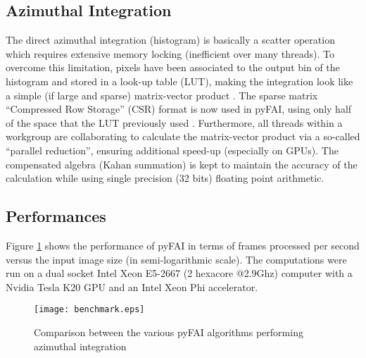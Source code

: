 \documentclass{iucr}
\begin{document}
\subsection{Azimuthal Integration}
The direct azimuthal integration (histogram) is basically a scatter operation
which requires extensive memory locking (inefficient over many threads).
To overcome this limitation, pixels have been
associated to the output bin of the histogram and stored in a look-up
table (LUT), making the integration look like a simple (if large and sparse)
matrix-vector product \cite{PyFAI_PDJ}.
The sparse matrix ``Compressed Row Storage'' (CSR) format is now used in pyFAI,
using only half of the space that the LUT previously used \cite{kieffer_ashiotis-proc-euroscipy-2014}.
Furthermore, all threads within a workgroup are collaborating to calculate the
matrix-vector product via a so-called ``parallel reduction'', ensuring
additional speed-up (especially on GPUs).
The compensated algebra (Kahan summation) is kept to maintain the accuracy
of the calculation while using single precision (32 bits) floating point
arithmetic.

\subsection{Performances}
Figure \ref{benchmark} shows the performance of pyFAI in terms of frames
processed per second versus the input image size (in semi-logarithmic scale).
The computations were run on a dual socket Intel Xeon
E5-2667 (2 hexacore @2.9Ghz) computer with a Nvidia Tesla K20 GPU and an Intel
Xeon Phi accelerator.

\begin{figure}
\label{benchmark}
\begin{center}
\texttt{[image: benchmark.eps]}
\caption{Comparison between the various pyFAI algorithms performing
azimuthal integration}
\end{center}
\end{figure}
\end{document}
